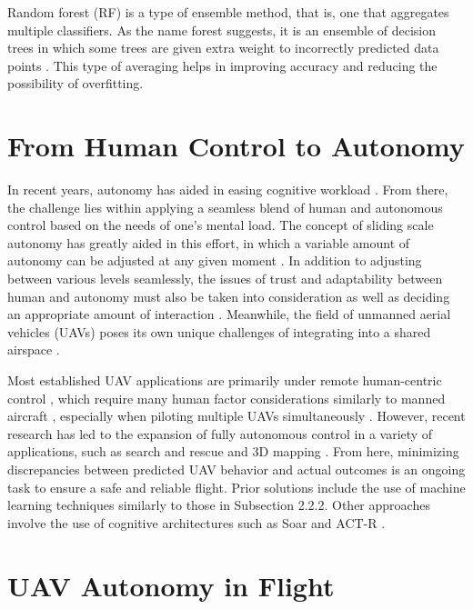 \documentclass[12pt]{uthesis-v12}  %
\begin{document}
Random forest (RF) is a type of ensemble method, that is, one that aggregates multiple classifiers. As the name forest suggests, it is an ensemble of decision trees in which some trees are given extra weight to incorrectly predicted data points \cite{liaw}. This type of averaging helps in improving accuracy and reducing the possibility of overfitting.

\section{From Human Control to Autonomy}

In recent years, autonomy has aided in easing cognitive workload \cite{endsley,rudisill}. From there, the challenge lies within applying a seamless blend of human and autonomous control based on the needs of one's mental load. The concept of sliding scale autonomy has greatly aided in this effort, in which a variable amount of autonomy can be adjusted at any given moment \cite{bruemmer, desai}. In addition to adjusting between various levels seamlessly, the issues of trust \cite{helldin} and adaptability \cite{christen} between human and autonomy must also be taken into consideration as well as deciding an appropriate amount of interaction \cite{beer}. Meanwhile, the field of unmanned aerial vehicles (UAVs) poses its own unique challenges of integrating into a shared airspace \cite{parke,chevalley,rein}. 

Most established UAV applications are primarily under remote human-centric control \cite{kirwan,kirwan2,dhillon,kurk,peschel}, which require many human factor considerations similarly to manned aircraft \cite{guznov,cooke,jasper,chen2,wohleber}, especially when piloting multiple UAVs simultaneously \cite{lin}. However, recent research has led to the expansion of fully autonomous control \cite{clough,karim,tomic,burkle,valavanis,bosch} in a variety of applications, such as search and rescue \cite{fabiani} and 3D mapping \cite{nex}. From here, minimizing discrepancies between predicted UAV behavior and actual outcomes is an ongoing task to ensure a safe and reliable flight. Prior solutions include the use of machine learning techniques similarly to those in Subsection 2.2.2. Other approaches involve the use of cognitive architectures \cite{franklin} such as Soar \cite{laird, nuxoll} and ACT-R \cite{anderson}.

\section{UAV Autonomy in Flight}
\end{document}
